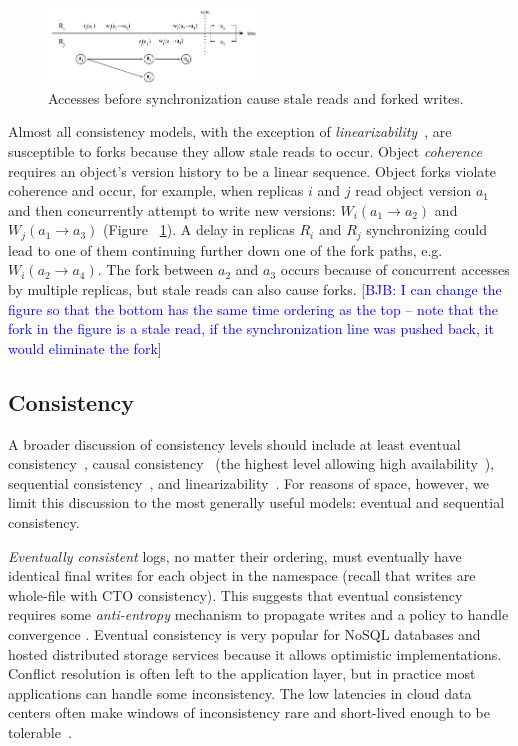 \documentclass[10pt,conference,letterpaper]{IEEEtran}
\newcommand{\blue}[1]{{\textcolor{blue}{#1}}}
\newcommand{\bjb}[1]{[\blue{BJB: #1}]}
\begin{document}
\begin{figure}[t]
    \centering
    \includegraphics[width=0.5\textwidth]{figures/forks}
    \caption{Accesses before synchronization cause stale reads and forked writes.}
    \label{fig:forks}
\end{figure}

Almost all consistency models, with the exception of
\textit{linearizability}~\cite{herlihy_linearizability:_1990}, are susceptible to forks
because they allow stale reads to occur.
Object \emph{coherence} requires an object's version history to be a linear sequence.
Object forks violate coherence and occur, for example, when replicas $i$ and $j$ read object version $a_1$
and then concurrently attempt to write new versions: $W_i(a_1 \rightarrow a_2)$ and
$W_j(a_1 \rightarrow a_3)$ (Figure ~\ref{fig:forks}).
A delay in replicas $R_i$ and $R_j$ synchronizing could lead to one of them continuing
further down one of the fork paths, e.g. $W_i(a_2 \rightarrow a_4)$.
The fork between $a_2$ and $a_3$ occurs because of concurrent accesses by multiple
replicas, but stale reads can also cause forks. \bjb{I can change the figure so that the bottom has the same time ordering as the top -- note that the fork in the figure is a stale read, if the synchronization line was pushed back, it would eliminate the fork}

\subsection{Consistency}

A broader discussion of consistency levels should include at least eventual consistency~\cite{terry_managing_1995},
causal consistency~\cite{causal} (the highest level allowing high availability~\cite{bailis_bolt-causal_2013}),
sequential consistency~\cite{sequential-consistency}, and linearizability~\cite{herlihy_linearizability:_1990}.
For reasons of space, however, we limit this discussion to the most generally useful models:
eventual and sequential consistency.

\emph{Eventually consistent} logs, no matter their ordering, must eventually have identical final
writes for each object in the namespace (recall that writes are whole-file with CTO consistency).
This suggests that eventual consistency requires some \textit{anti-entropy} mechanism to
propagate writes and a policy to handle convergence \cite{terry_managing_1995}.
Eventual consistency is very popular for NoSQL databases and hosted distributed storage
services \cite{decandia_dynamo:_2007,lakshman_cassandra:_2010} because it allows
optimistic implementations.
Conflict resolution is often left to the application layer, but
in practice most applications can handle some inconsistency.
The low latencies in cloud data centers often make windows of
inconsistency rare and
short-lived enough to be tolerable~\cite{bailis_quantifying_2014}.
\end{document}

